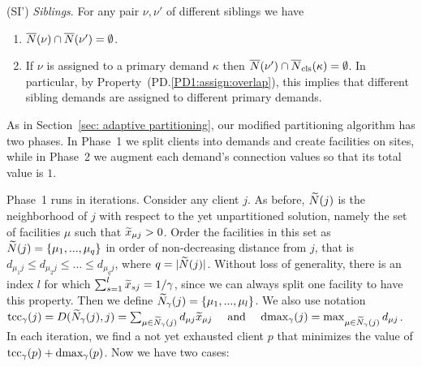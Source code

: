 \documentclass{llncs}
\begin{document}
\begin{description}
\begin{enumerate}
	\end{enumerate}
	
\item{(SI')} \emph{Siblings}. For any pair $\nu,\nu'$ of different siblings we have
  \begin{enumerate}

	\item \label{SI1:siblings disjoint}
		  ${\overline{N}}(\nu)\cap {\overline{N}}(\nu') = \emptyset$.
		
	\item \label{SI1:primary disjoint} If $\nu$ is assigned to a primary demand $\kappa$ then
 		${\overline{N}}(\nu')\cap {\overline{N}}_{\text{cls}}(\kappa) = \emptyset$. In particular, by Property~(PD.\ref{PD1:assign:overlap}),
		this implies that different sibling demands are assigned to different primary demands.

	\end{enumerate}
	
\end{description}


 As in Section~\ref{sec: adaptive partitioning}, our modified partitioning algorithm
has two phases.
In Phase~1 we split clients into demands and create facilities on
sites, while in Phase~2 we augment each demand's
connection values so that its total value is $1$.

Phase~1 runs in iterations. Consider any client $j$.  As before,
${\widetilde N}(j)$ is the neighborhood of $j$ with respect to the yet
unpartitioned solution, namely the set of facilities $\mu$ such that
${\widetilde x}_{\mu j}>0$. Order the facilities in this set as
${\widetilde N}(j) = { \left\{ \mu_1,...,\mu_q \right\} }$ in order of non-decreasing
distance from $j$, that is
$d_{\mu_1 j} \leq d_{\mu_2 j} \leq \ldots \leq d_{\mu_q j}$, where
$q = |{\widetilde N}(j)|$. Without loss of generality, there is an index
$l$ for which $\sum_{s=1}^l {\widetilde x}_{s j} = 1/\gamma$, since we can
always split one facility to have this property. Then we define
${\widetilde N}_{\gamma}(j) = { \left\{ \mu_1,...,\mu_l \right\} }$. We also use notation
%
$
\textrm{tcc}_\gamma(j) =  D({\widetilde N}_\gamma(j), j) = \sum_{\mu\in{\widetilde N}_{\gamma}(j)} d_{\mu j} {\widetilde x}_{\mu j}
			\quad\textrm{ and }\quad
 \text{dmax}_\gamma(j) = \max_{\mu \in {\widetilde N}_{\gamma}(j)} d_{\mu j}
$.
%
In each iteration, we find a not yet exhausted client $p$ that minimizes the
value of $\textrm{tcc}_\gamma(p) + \text{dmax}_\gamma(p)$. Now we have two cases:
\end{document}
